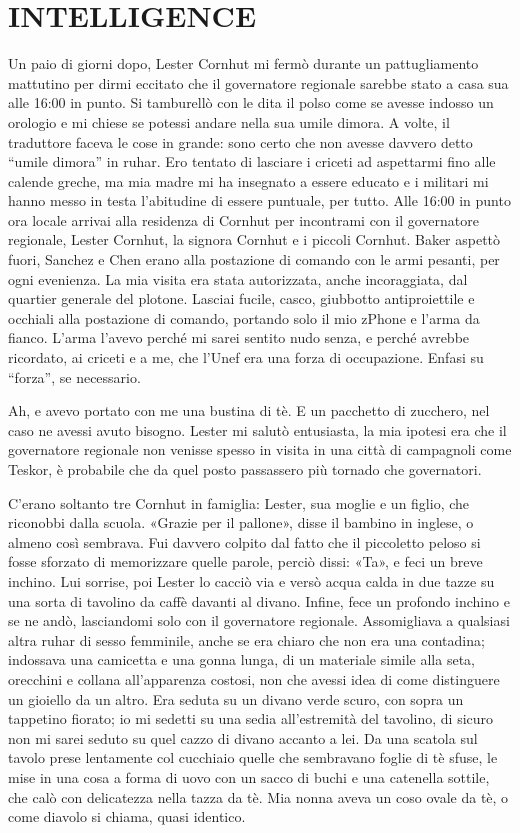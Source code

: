 \chapter{INTELLIGENCE}\label{intelligence}

\hfill\break

Un paio di giorni dopo, Lester Cornhut mi fermò durante un
pattugliamento mattutino per dirmi eccitato che il governatore regionale
sarebbe stato a casa sua alle 16:00 in punto. Si tamburellò con le dita
il polso come se avesse indosso un orologio e mi chiese se potessi
andare nella sua umile dimora. A volte, il traduttore faceva le cose in
grande: sono certo che non avesse davvero detto ``umile dimora'' in
ruhar. Ero tentato di lasciare i criceti ad aspettarmi fino alle calende
greche, ma mia madre mi ha insegnato a essere educato e i militari mi
hanno messo in testa l'abitudine di essere puntuale, per tutto. Alle
16:00 in punto ora locale arrivai alla residenza di Cornhut per
incontrami con il governatore regionale, Lester Cornhut, la signora
Cornhut e i piccoli Cornhut. Baker aspettò fuori, Sanchez e Chen erano
alla postazione di comando con le armi pesanti, per ogni evenienza. La
mia visita era stata autorizzata, anche incoraggiata, dal quartier
generale del plotone. Lasciai fucile, casco, giubbotto antiproiettile e
occhiali alla postazione di comando, portando solo il mio zPhone e
l'arma da fianco. L'arma l'avevo perché mi sarei sentito nudo senza, e
perché avrebbe ricordato, ai criceti e a me, che l'Unef era una forza di
occupazione. Enfasi su ``forza'', se necessario.

Ah, e avevo portato con me una bustina di tè. E un pacchetto di
zucchero, nel caso ne avessi avuto bisogno. Lester mi salutò entusiasta,
la mia ipotesi era che il governatore regionale non venisse spesso in
visita in una città di campagnoli come Teskor, è probabile che da quel
posto passassero più tornado che governatori.

C'erano soltanto tre Cornhut in famiglia: Lester, sua moglie e un
figlio, che riconobbi dalla scuola. «Grazie per il pallone», disse il
bambino in inglese, o almeno così sembrava. Fui davvero colpito dal
fatto che il piccoletto peloso si fosse sforzato di memorizzare quelle
parole, perciò dissi: «Ta», e feci un breve inchino. Lui sorrise, poi
Lester lo cacciò via e versò acqua calda in due tazze su una sorta di
tavolino da caffè davanti al divano. Infine, fece un profondo inchino e
se ne andò, lasciandomi solo con il governatore regionale. Assomigliava
a qualsiasi altra ruhar di sesso femminile, anche se era chiaro che non
era una contadina; indossava una camicetta e una gonna lunga, di un
materiale simile alla seta, orecchini e collana all'apparenza costosi,
non che avessi idea di come distinguere un gioiello da un altro. Era
seduta su un divano verde scuro, con sopra un tappetino fiorato; io mi
sedetti su una sedia all'estremità del tavolino, di sicuro non mi sarei
seduto su quel cazzo di divano accanto a lei. Da una scatola sul tavolo
prese lentamente col cucchiaio quelle che sembravano foglie di tè sfuse,
le mise in una cosa a forma di uovo con un sacco di buchi e una
catenella sottile, che calò con delicatezza nella tazza da tè. Mia nonna
aveva un coso ovale da tè, o come diavolo si chiama, quasi identico.

